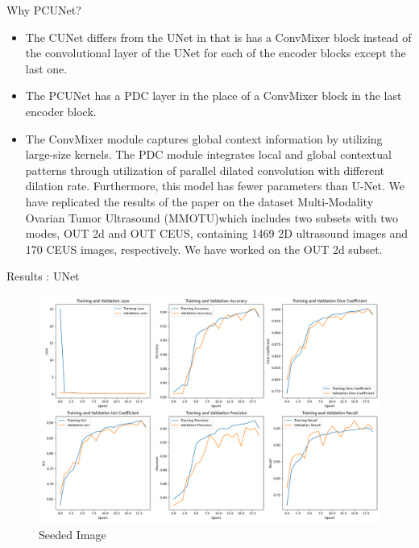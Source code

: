 \documentclass{beamer}
\begin{document}
\begin{frame}{Why PCUNet?}
    \begin{itemize}
        \item The CUNet differs from the UNet in that is has a ConvMixer block instead of the convolutional layer of the UNet for 
        each of the encoder blocks except the last one.
        \item The PCUNet has a PDC layer in the place of a ConvMixer block in the last encoder block.
        \item The ConvMixer module captures global context information by utilizing large-size kernels. The PDC module integrates local
        and global contextual patterns through utilization of parallel dilated convolution with different dilation rate. Furthermore,
        this model has fewer parameters than U-Net. We have replicated the results of the paper on the dataset Multi-Modality Ovarian Tumor Ultrasound
        (MMOTU)which includes two subsets with two modes, OUT 2d and OUT CEUS, containing 1469 2D ultrasound images and 
        170 CEUS images, respectively. We have worked on the OUT 2d subset.
    \end{itemize}
\end{frame}




\begin{frame}{Results : UNet}
    \begin{figure}[H]
        \centering
        \includegraphics[width=\textwidth]{unet_metrics.png}
        \caption{Seeded Image}
        \label{fig:RU}
    \end{figure}
\end{frame}
\end{document}
